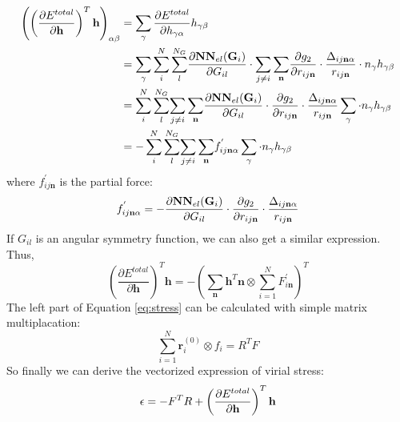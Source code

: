 \documentclass[preprint]{revtex4-2}
\begin{document}
\begin{align}
\label{eq:dEdhTh_g2_expanded}
\left(
    \left(\frac{\partial E^{total}}{\partial \mathbf{h}}\right)^T \mathbf{h}
\right)_{\alpha\beta} & = 
\sum_{\gamma}{\frac{\partial{E^{total}}}{\partial h_{\gamma\alpha}} h_{\gamma\beta}} \nonumber \\
& = \sum_{\gamma}{\sum_{i}^{N}{\sum_{l}^{N_G}}{
    \frac{\partial \mathbf{NN}_{el}(\mathbf{G}_i)}{\partial G_{il}}
    \cdot
    \sum_{j \neq i}{\sum_{\mathbf{n}}}{
    \frac{\partial g_2}{\partial r_{ij\mathbf{n}}} 
    \cdot 
    \frac{\Delta_{ij\mathbf{n}\alpha}}{r_{ij\mathbf{n}}} \cdot n_{\gamma}} h_{\gamma\beta}
}} \nonumber \\
& = \sum_{i}^{N}{\sum_{l}^{N_G}}{\sum_{j \neq i}{\sum_{\mathbf{n}}}{
    \frac{\partial \mathbf{NN}_{el}(\mathbf{G}_i)}{\partial G_{il}}
    \cdot
    \frac{\partial g_2}{\partial r_{ij\mathbf{n}}} 
    \cdot 
    \frac{\Delta_{ij\mathbf{n}\alpha}}{r_{ij\mathbf{n}}}}
    \sum_{\gamma}{\cdot n_{\gamma}h_{\gamma\beta}}
} \nonumber \\
& = -\sum_{i}^{N}{\sum_{l}^{N_G}}{\sum_{j \neq i}{\sum_{\mathbf{n}}}{
    f^{'}_{ij\mathbf{n}\alpha}
    \sum_{\gamma}{\cdot n_{\gamma}h_{\gamma\beta}}
}}
\end{align}
where $f^{'}_{ij\mathbf{n}}$ is the partial force:
\begin{equation}
f^{'}_{ij\mathbf{n}\alpha} = 
-\frac{\partial \mathbf{NN}_{el}(\mathbf{G}_i)}{\partial G_{il}} \cdot 
\frac{\partial g_2}{\partial r_{ij\mathbf{n}}} \cdot 
\frac{\Delta_{ij\mathbf{n}\alpha}}{r_{ij\mathbf{n}}}
\end{equation}
If $G_{il}$ is an angular symmetry function, we can also get a similar 
expression. Thus,
\begin{equation}
\left(\frac{\partial E^{total}}{\partial \mathbf{h}}\right)^T \mathbf{h} =
-\left(\sum_{\mathbf{n}}{\mathbf{h}^T\mathbf{n}} \otimes 
\sum_{i=1}^{N}{F^{\prime}_{i\mathbf{n}}}\right)^T
\end{equation}
The left part of Equation \ref{eq:stress} can be calculated with 
simple matrix multiplacation:
\begin{equation}
\sum_{i=1}^{N}{\mathbf{r}_i^{(0)} \otimes f_i} = R^{T} F
\end{equation}
So finally we can derive the vectorized expression of virial stress:
\begin{equation}
\epsilon = -F^{T} R + \left( \frac{\partial{E^{total}}}{\partial \mathbf{h}} \right)^T\mathbf{h}
\end{equation}
\end{document}
